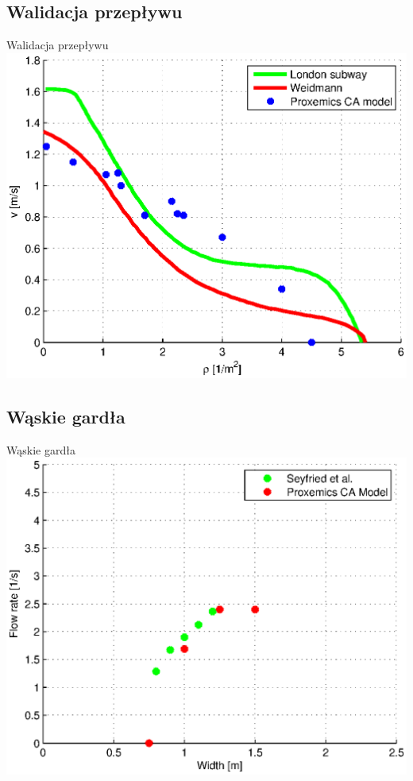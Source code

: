 \subsection{Walidacja przepływu}
\begin{frame}{Walidacja przepływu}
\includegraphics[width=\textwidth,height=0.8\textheight,keepaspectratio]{wykresy-weidmann_valid}
\end{frame}

\subsection{Wąskie gardła}
\begin{frame}{Wąskie gardła}
\includegraphics[width=\textwidth,height=0.8\textheight,keepaspectratio]{wykresy-bottleneck_validated}
\end{frame}
